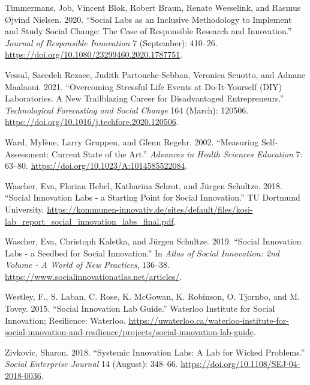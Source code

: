 \documentclass[AMA,STIX1COL,APA,STIX2COL]{WileyNJD-v2}
\newlength{\cslhangindent}
\newenvironment{CSLReferences}[2] %
 {%
  \setlength{\parindent}{0pt}
  \ifodd #1 \everypar{\setlength{\hangindent}{\cslhangindent}}\ignorespaces\fi
  \ifnum #2 > 0
  \setlength{\parskip}{#2\baselineskip}
  \fi
 }%
 {}
\begin{document}
\begin{CSLReferences}{1}{0}
\leavevmode{}%
Timmermans, Job, Vincent Blok, Robert Braun, Renate Wesselink, and
Rasmus Øjvind Nielsen. 2020. {``Social Labs as an Inclusive Methodology
to Implement and Study Social Change: The Case of Responsible Research
and Innovation.''} \emph{Journal of Responsible Innovation} 7
(September): 410--26.
\url{https://doi.org/10.1080/23299460.2020.1787751}.

\leavevmode{}%
Vessal, Saeedeh Rezaee, Judith Partouche-Sebban, Veronica Scuotto, and
Adnane Maalaoui. 2021. {``Overcoming Stressful Life Events at
Do-It-Yourself (DIY) Laboratories. A New Trailblazing Career for
Disadvantaged Entrepreneurs.''} \emph{Technological Forecasting and
Social Change} 164 (March): 120506.
\url{https://doi.org/10.1016/j.techfore.2020.120506}.

\leavevmode{}%
Ward, Mylène, Larry Gruppen, and Glenn Regehr. 2002. {``Measuring
Self-Assessment: Current State of the Art.''} \emph{Advances in Health
Sciences Education} 7: 63--80.
\url{https://doi.org/10.1023/A:1014585522084}.

\leavevmode{}%
Wascher, Eva, Florian Hebel, Katharina Schrot, and Jürgen Schultze.
2018. {``Social Innovation Labs - a Starting Point for Social
Innovation.''} TU Dortmund University.
\url{https://kommunen-innovativ.de/sites/default/files/kosi-lab_report_social_innovation_labs_final.pdf}.

\leavevmode{}%
Wascher, Eva, Christoph Kaletka, and Jürgen Schultze. 2019. {``Social
Innovation Labs - a Seedbed for Social Innovation.''} In \emph{Atlas of
Social Innovation: 2nd Volume - A World of New Practices}, 136--38.
\url{https://www.socialinnovationatlas.net/articles/}.

\leavevmode{}%
Westley, F., S. Laban, C. Rose, K. McGowan, K. Robinson, O. Tjornbo, and
M. Tovey. 2015. {``Social Innovation Lab Guide.''} Waterloo Institute
for Social Innovation; Resilience: Waterloo.
\url{https://uwaterloo.ca/waterloo-institute-for-social-innovation-and-resilience/projects/social-innovation-lab-guide}.

\leavevmode{}%
Zivkovic, Sharon. 2018. {``Systemic Innovation Labs: A Lab for Wicked
Problems.''} \emph{Social Enterprise Journal} 14 (August): 348--66.
\url{https://doi.org/10.1108/SEJ-04-2018-0036}.

\end{CSLReferences}
\end{document}
